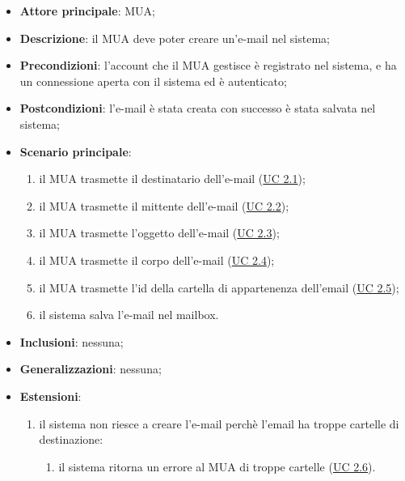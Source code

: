     \begin{itemize}
        \item \textbf{Attore principale}: MUA;
        \item \textbf{Descrizione}: il MUA deve poter creare un'e-mail nel sistema;
        \item \textbf{Precondizioni}: l’account che il MUA gestisce è registrato nel sistema, e ha un connessione aperta con il sistema ed è autenticato;
        \item \textbf{Postcondizioni}: l'e-mail è stata creata con successo è stata salvata nel sistema;
        \item \textbf{Scenario principale}:
            \begin{enumerate}
                \item il MUA trasmette il destinatario dell'e-mail (\hyperref[sec:UC2.1]{UC 2.1});
                \item il MUA trasmette il mittente dell'e-mail (\hyperref[sec:UC2.2]{UC 2.2});
                \item il MUA trasmette l'oggetto dell'e-mail (\hyperref[sec:UC2.3]{UC 2.3});
                \item il MUA trasmette il corpo dell'e-mail (\hyperref[sec:UC2.4]{UC 2.4});
                \item il MUA trasmette l'id della cartella di appartenenza dell'email (\hyperref[sec:UC2.5]{UC 2.5});
                \item il sistema salva l'e-mail nel mailbox.
            \end{enumerate}
        \item \textbf{Inclusioni}: nessuna;
        \item \textbf{Generalizzazioni}: nessuna;
        \item \textbf{Estensioni}: 
            \begin{enumerate}[label=\alph*.]
                \item il sistema non riesce a creare l'e-mail perchè l'email ha troppe cartelle di destinazione:
                \begin{enumerate}[label=\arabic*.]
                    \item il sistema ritorna un errore al MUA di troppe cartelle (\hyperref[sec:UC2.6]{UC 2.6}).
                \end{enumerate}
            \end{enumerate}
    \end{itemize}

